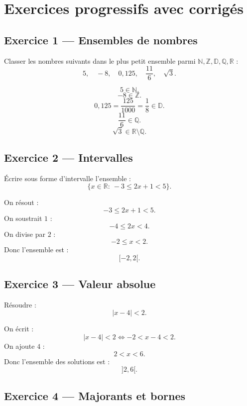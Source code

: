 \documentclass[11pt,a4paper]{article}
\newcommand{\N}{\mathbb N}
\newcommand{\Z}{\mathbb Z}
\newcommand{\D}{\mathbb D}
\newcommand{\Q}{\mathbb Q}
\newcommand{\R}{\mathbb R}
\newcommand{\abs}[1]{\left|#1\right|}
\newcommand{\ssi}{\Longleftrightarrow}
\begin{document}
\section{Exercices progressifs avec corrigés}

\subsection*{Exercice 1 — Ensembles de nombres}

\begin{exercicebox}
Classer les nombres suivants dans le plus petit ensemble parmi \(\N,\Z,\D,\Q,\R\) :
\[
5,\quad -8,\quad 0,125,\quad \frac{11}{6},\quad \sqrt3.
\]
\end{exercicebox}

\begin{correctionbox}
\[
5\in\N.
\]
\[
-8\in\Z.
\]
\[
0,125=\frac{125}{1000}=\frac18\in\D.
\]
\[
\frac{11}{6}\in\Q.
\]
\[
\sqrt3\in\R\setminus\Q.
\]
\end{correctionbox}

\subsection*{Exercice 2 — Intervalles}

\begin{exercicebox}
Écrire sous forme d'intervalle l'ensemble :
\[
\{x\in\R:\ -3\leq 2x+1<5\}.
\]
\end{exercicebox}

\begin{correctionbox}
On résout :
\[
-3\leq2x+1<5.
\]
On soustrait \(1\) :
\[
-4\leq2x<4.
\]
On divise par \(2\) :
\[
-2\leq x<2.
\]
Donc l'ensemble est :
\[
[-2,2[.
\]
\end{correctionbox}

\subsection*{Exercice 3 — Valeur absolue}

\begin{exercicebox}
Résoudre :
\[
\abs{x-4}<2.
\]
\end{exercicebox}

\begin{correctionbox}
On écrit :
\[
\abs{x-4}<2
\ssi
-2<x-4<2.
\]
On ajoute \(4\) :
\[
2<x<6.
\]
Donc l'ensemble des solutions est :
\[
]2,6[.
\]
\end{correctionbox}

\subsection*{Exercice 4 — Majorants et bornes}
\end{document}
